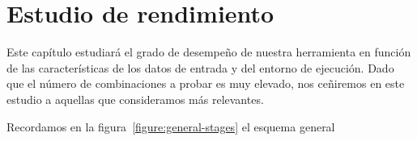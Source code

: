 \chapter{Estudio de rendimiento\label{validation}}

Este capítulo estudiará el grado de desempeño de nuestra herramienta en
función de las características de los datos de entrada y del entorno de
ejecución. Dado que el número de combinaciones a probar es muy elevado, nos
ceñiremos en este estudio a aquellas que consideramos más relevantes.

Recordamos en la figura~\ref{figure:general-stages} el esquema general

